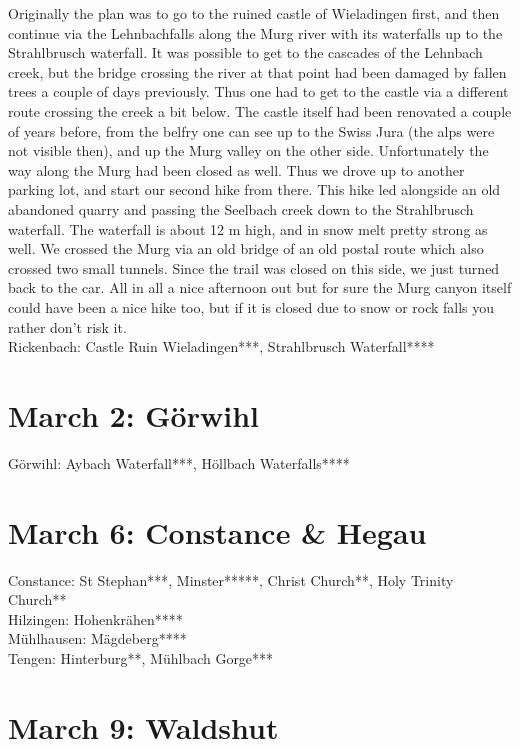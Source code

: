 Originally the plan was to go to the ruined castle of Wieladingen first, and then continue via the Lehnbachfalls along the Murg river with its waterfalls up to the Strahlbrusch waterfall. It was possible to get to the cascades of the Lehnbach creek, but the bridge crossing the river at that point had been damaged by fallen trees a couple of days previously. Thus one had to get to the castle via a different route crossing the creek a bit below. The castle itself had been renovated a couple of years before, from the belfry one can see up to the Swiss Jura (the alps were not visible then), and up the Murg valley on the other side. Unfortunately the way along the Murg had been closed as well. Thus we drove up to another parking lot, and start our second hike from there. This hike led alongside an old abandoned quarry and passing the Seelbach creek down to the Strahlbrusch waterfall. The waterfall is about 12 m high, and in snow melt pretty strong as well. We crossed the Murg via an old bridge of an old postal route which also crossed two small tunnels. Since the trail was closed on this side, we just turned back to the car. All in all a nice afternoon out but for sure the Murg canyon itself could have been a nice hike too, but if it is closed due to snow or rock falls you rather don't risk it.\\

Rickenbach: Castle Ruin Wieladingen***, Strahlbrusch Waterfall****

\section{March 2: G\"orwihl}
\label{2021:Goerwihl}

G\"orwihl: Aybach Waterfall***, H\"ollbach Waterfalls****

\section{March 6: Constance \& Hegau}
\label{2021:Konstanz}

Constance: St Stephan***, Minster*****, Christ Church**, Holy Trinity Church**\\
Hilzingen: Hohenkr\"ahen****\\
M\"uhlhausen: M\"agdeberg****\\
Tengen: Hinterburg**, M\"uhlbach Gorge***

\section{March 9: Waldshut}
\label{2021:Waldshut0309}

